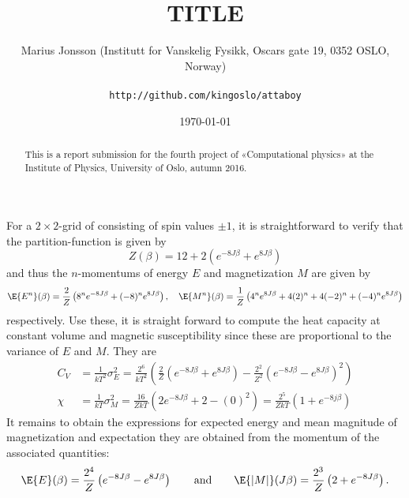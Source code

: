 \documentclass[11pt,english,a4paper]{article}
\author{\normalsize Marius Jonsson (Institutt for Vanskelig Fysikk, Oscars gate 19, 0352 OSLO, Norway) \\\\
\vspace{5px}
\normalsize \texttt{http://github.com/kingoslo/attaboy}}
\title{\bf \uppercase{TiTlE}}
\date{\normalsize \today}
\begin{document}
\maketitle
\begin{abstract} \normalsize This is a report submission for the fourth project of «Computational physics» at the Institute of Physics, University of Oslo, autumn 2016.
\end{abstract}
\lstset{
  xleftmargin=.2\textwidth, xrightmargin=.2\textwidth
}
For a $2 \times 2$-grid of consisting of spin values $\pm 1$, it is straightforward to verify that the partition-function is given by
\[
Z(\beta) = 12 + 2\left( e^{ -8 J\beta} + e^{ 8 J\beta} \right)
\]
and thus the $n$-momentums of energy $E$ and magnetization $M$ are given by
\[
\E{E^n}(\beta) = \frac{2}{Z}\left( 8^n e^{ -8 J\beta} + (-8)^n e^{ 8 J\beta}  \right), \quad \E{M^n}(\beta) = \frac{1}{Z}\left( 4^n e^{ 8 J\beta} + 4(2)^n + 4(-2)^n + (-4)^n e^{ 8 J\beta}  \right)
\]
respectively. Use these, it is straight forward to compute the heat capacity at constant volume and magnetic susceptibility since these are proportional to the variance of $E$ and $M$. They are
\begin{align*}
C_V &= \frac{1}{kT^2}\sigma_E^2 = \frac{2^6}{kT^2}\left(  \frac{2}{Z}\left( e^{ -8J\beta} + e^{ 8J\beta} \right) - \frac{2^2}{Z^2}\left( e^{ -8J\beta} - e^{ 8J\beta} \right)^2  \right) \\
\chi &= \frac{1}{kT} \sigma_M^2 = \frac{16}{ZkT} \left( 2e^{ -8 J\beta} + 2 - \left( 0 \right)^2 \right) = \frac{2^5}{ZkT}\left( 1 + e^{ -8j\beta} \right)
\end{align*}
It remains to obtain the expressions for expected energy and mean magnitude of magnetization and expectation they are obtained from the momentum of the associated quantities:
\[
\E{E}(\beta) = \frac{2^4}{Z}\left( e^{ -8 J\beta} - e^{ 8 J\beta}  \right) \qquad \text{and} \qquad \E{|M|}(J\beta) = \frac{2^3}{Z}\left(  2 + e^{ -8 J\beta} \right).
\]
\printbibliography
\end{document}
